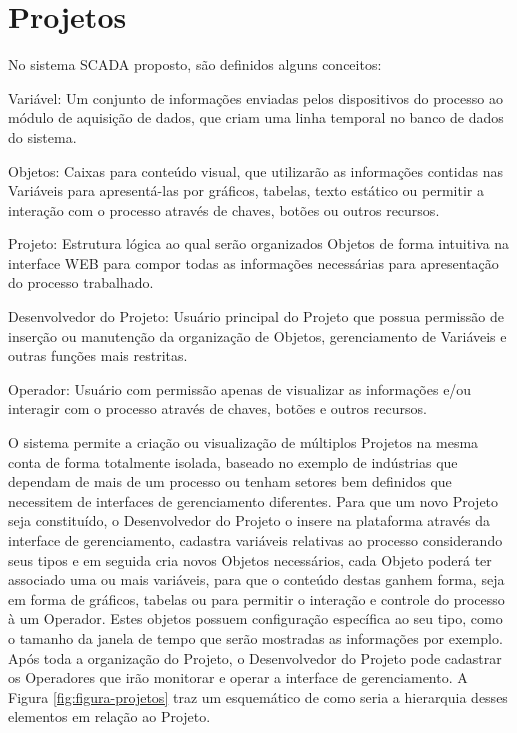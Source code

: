 \section{Projetos}
\label{sec:projetos}
No sistema \gls{SCADA} proposto, são definidos alguns conceitos:

\begin{alineascomponto}
    \item Variável: Um conjunto de informações enviadas pelos dispositivos do processo ao módulo de aquisição de dados, que criam uma linha temporal no banco de dados do sistema.
    \item Objetos: Caixas para conteúdo visual, que utilizarão as informações contidas nas Variáveis para apresentá-las por gráficos, tabelas, texto estático ou permitir a interação com o processo através de chaves, botões ou outros recursos.
    \item Projeto: Estrutura lógica ao qual serão organizados Objetos de forma intuitiva na interface \gls{WEB} para compor todas as informações necessárias para apresentação do processo trabalhado.
    \item Desenvolvedor do Projeto: Usuário principal do Projeto que possua permissão de inserção ou manutenção da organização de Objetos, gerenciamento de Variáveis e outras funções mais restritas.
    \item Operador: Usuário com permissão apenas de visualizar as informações e/ou interagir com o processo através de chaves, botões e outros recursos.
\end{alineascomponto}

O sistema permite a criação ou visualização de múltiplos Projetos na mesma conta de forma totalmente isolada, baseado no exemplo de indústrias que dependam de mais de um processo ou tenham setores bem definidos que necessitem de interfaces de gerenciamento diferentes. Para que um novo Projeto seja constituído, o Desenvolvedor do Projeto o insere na plataforma através da interface de gerenciamento, cadastra variáveis relativas ao processo considerando seus tipos e em seguida cria novos Objetos necessários, cada Objeto poderá ter associado uma ou mais variáveis, para que o conteúdo destas ganhem forma, seja em forma de gráficos, tabelas ou para permitir o interação e controle do processo à um Operador. Estes objetos possuem configuração específica ao seu tipo, como o tamanho da janela de tempo que serão mostradas as informações por exemplo. Após toda a organização do Projeto, o Desenvolvedor do Projeto pode cadastrar os Operadores que irão monitorar e operar a interface de gerenciamento. A Figura \ref{fig:figura-projetos} traz um esquemático de como seria a hierarquia desses elementos em relação ao Projeto. 

